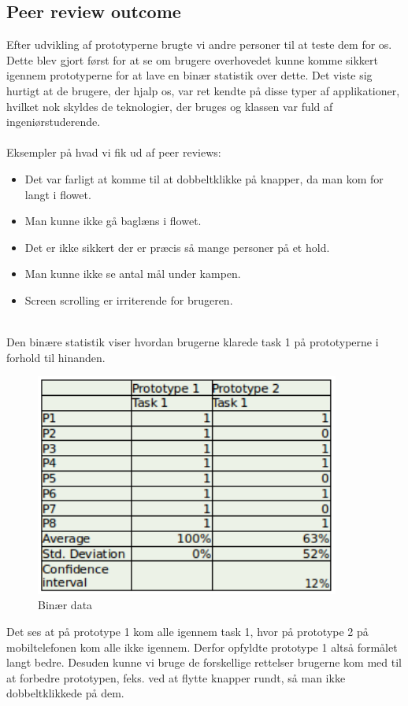 \newpage
\subsection*{Peer review outcome}
Efter udvikling af prototyperne brugte vi andre personer til at teste dem for os. Dette blev gjort først for at se om brugere overhovedet kunne komme sikkert igennem prototyperne for at lave en binær statistik over dette. Det viste sig hurtigt at de brugere, der hjalp os, var ret kendte på disse typer af applikationer, hvilket nok skyldes de teknologier, der bruges og klassen var fuld af ingeniørstuderende.\\\\Eksempler på hvad vi fik ud af peer reviews:
\begin{itemize}
\item Det var farligt at komme til at dobbeltklikke på knapper, da man kom for langt i flowet.
\item Man kunne ikke gå baglæns i flowet.
\item Det er ikke sikkert der er præcis så mange personer på et hold.
\item Man kunne ikke se antal mål under kampen.
\item Screen scrolling er irriterende for brugeren.\\\\
\end{itemize} 

Den binære statistik viser hvordan brugerne klarede task 1 på prototyperne i forhold til hinanden.
\begin{figure}[ht!]
\centering
\includegraphics[width=100mm]{images/binary}
\caption{Binær data}
\end{figure}
Det ses at på prototype 1 kom alle igennem task 1, hvor på prototype 2 på mobiltelefonen kom alle ikke igennem. Derfor opfyldte prototype 1 altså formålet langt bedre. Desuden kunne vi bruge de forskellige rettelser brugerne kom med til at forbedre prototypen, feks. ved at flytte knapper rundt, så man ikke dobbeltklikkede på dem.\\\\

